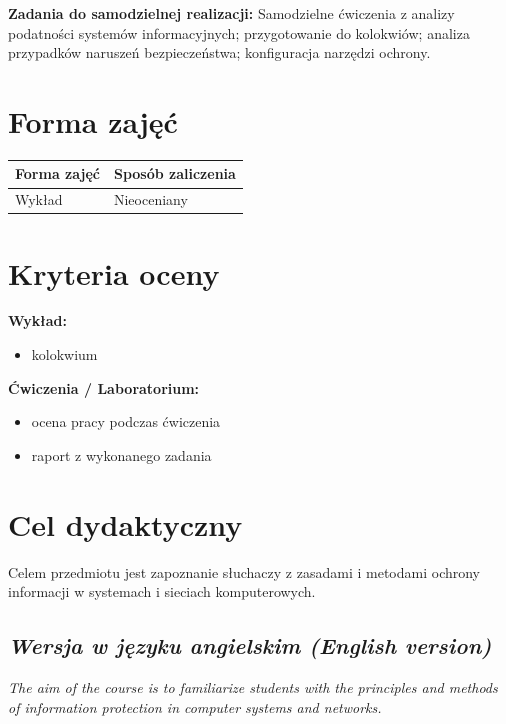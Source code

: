 \documentclass[12pt, a4paper]{article}
\newcommand{\thdrule}{\noalign{\global\setlength{\extrarowheight}{0pt}}}
\newcommand{\thdend}{\noalign{\global\setlength{\extrarowheight}{3pt}}}
\begin{document}
\vspace{4pt}
\noindent\textbf{Zadania do samodzielnej realizacji:} Samodzielne ćwiczenia z analizy podatności systemów informacyjnych; przygotowanie do kolokwiów; analiza przypadków naruszeń bezpieczeństwa; konfiguracja narzędzi ochrony.

\section{Forma zajęć}

\begin{center}
{\scriptsize
\begin{tabular}{m{5cm}m{8cm}}
\thdrule\toprule
\rowcolor{pjatkRed} {\color{white}\textbf{Forma zajęć}} & {\color{white}\textbf{Sposób zaliczenia}} \\
\midrule\thdend
  \rowcolor{tableRowLight} Wykład & Nieoceniany \\
\bottomrule
\end{tabular}}
\end{center}

\section{Kryteria oceny}

\textbf{Wykład:}
\begin{itemize}
  \item kolokwium
\end{itemize}
\vspace{4pt}
\textbf{Ćwiczenia / Laboratorium:}
\begin{itemize}
  \item ocena pracy podczas ćwiczenia
  \item raport z wykonanego zadania
\end{itemize}


\section{Cel dydaktyczny}

Celem przedmiotu jest zapoznanie słuchaczy z zasadami i metodami ochrony informacji w systemach i sieciach komputerowych.

\subsection*{\textit{Wersja w języku angielskim (English version)}}

\textit{The aim of the course is to familiarize students with the principles and methods of information protection in computer systems and networks.}
\end{document}
